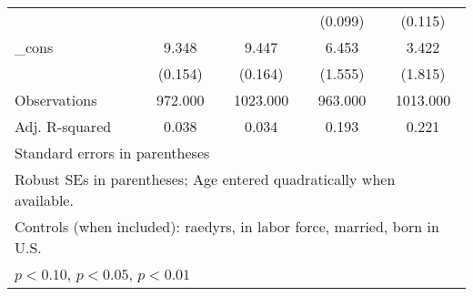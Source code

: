 \begin{table}[htbp]
\begin{tabular}{l*{4}{c}}
          &                  &                  &  (0.099)         &  (0.115)         \\
\_cons    &    9.348\sym{***}&    9.447\sym{***}&    6.453\sym{***}&    3.422\sym{*}  \\
          &  (0.154)         &  (0.164)         &  (1.555)         &  (1.815)         \\
\midrule
Observations&  972.000         & 1023.000         &  963.000         & 1013.000         \\
Adj. R-squared&    0.038         &    0.034         &    0.193         &    0.221         \\
\bottomrule
\multicolumn{5}{l}{\footnotesize Standard errors in parentheses}\\
\multicolumn{5}{l}{\footnotesize Robust SEs in parentheses; Age entered quadratically when available.}\\
\multicolumn{5}{l}{\footnotesize Controls (when included): raedyrs, in labor force, married, born in U.S.}\\
\multicolumn{5}{l}{\footnotesize \sym{*} \(p<0.10\), \sym{**} \(p<0.05\), \sym{***} \(p<0.01\)}\\
\end{tabular}
\end{table}
